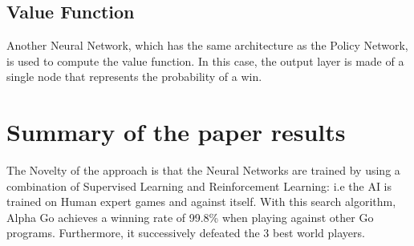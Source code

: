 \documentclass[12pt]{article}
\begin{document}
\subsection{Value Function}
Another Neural Network, which has the same architecture as the Policy Network, is used to compute the value function. In this case, the output layer is made of a single node that represents the probability of a win.

\section{Summary of the paper results}
The Novelty of the approach is that the Neural Networks are trained by using a combination of Supervised Learning and Reinforcement Learning: i.e the AI is trained on Human expert games and against itself. 
With this search algorithm, Alpha Go achieves a winning rate of 99.8\% when playing against other Go programs. Furthermore, it successively defeated the 3 best world players.
\end{document}
